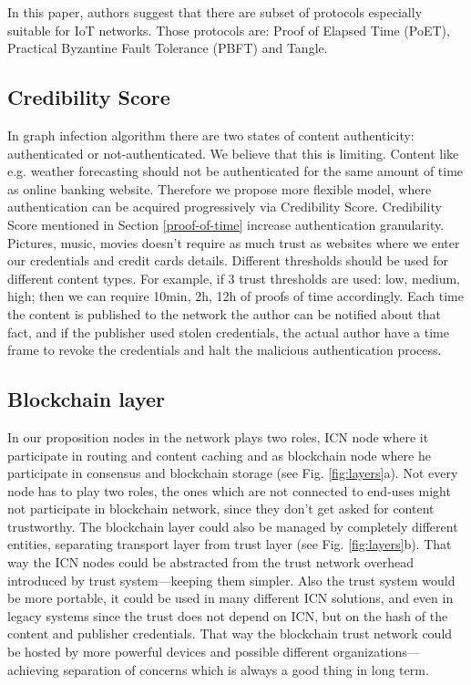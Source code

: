 \documentclass[nostrict]{szablonPG}
\begin{document}
In this paper, authors suggest that there are subset of protocols especially suitable for IoT networks. Those protocols are: Proof of Elapsed Time (PoET), Practical Byzantine Fault Tolerance (PBFT) and Tangle.

\subsection{Credibility Score}
In graph infection algorithm there are two states of content authenticity: authenticated or not-authenticated. We believe that this is limiting. Content like e.g. weather forecasting should not be authenticated for the same amount of time as online banking website. Therefore we propose more flexible model, where authentication can be acquired progressively via Credibility Score. Credibility Score mentioned in Section \ref{proof-of-time} increase authentication granularity. Pictures, music, movies doesn't require as much trust as websites where we enter our credentials and credit cards details. Different thresholds should be used for different content types. For example, if 3 trust thresholds are used: low, medium, high; then we can require 10min, 2h, 12h of proofs of time accordingly. Each time the content is published to the network the author can be notified about that fact, and if the publisher used stolen credentials, the actual author have a time frame to revoke the credentials and halt the malicious authentication process.

\subsection{Blockchain layer}
In our proposition nodes in the network plays two roles, ICN node where it participate in routing and content caching and as blockchain node where he participate in consensus and blockchain storage (see Fig. \ref{fig:layers}a). Not every node has to play two roles, the ones which are not connected to end-uses might not participate in blockchain network, since they don't get asked for content trustworthy. 
The blockchain layer could also be managed by completely different entities, separating transport layer from trust layer (see Fig. \ref{fig:layers}b). That way the ICN nodes could be abstracted from the trust network overhead introduced by trust system––keeping them simpler. Also the trust system would be more portable, it could be used in many different ICN solutions, and even in legacy systems since the trust does not depend on ICN, but on the hash of the content and publisher credentials. That way the blockchain trust network could be hosted by more powerful devices and possible different organizations––achieving separation of concerns which is always a good thing in long term.
\end{document}
